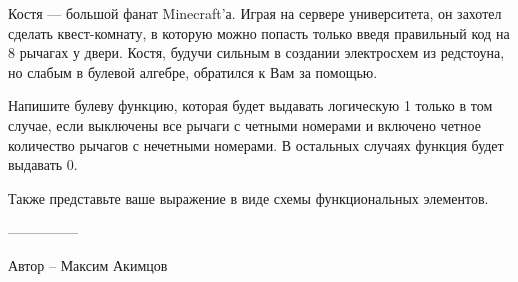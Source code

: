 \question
Костя — большой фанат Minecraft’а. Играя на сервере университета, он захотел сделать квест-комнату, в которую можно попасть только введя правильный код на 8 рычагах у двери. Костя, будучи сильным в создании электросхем из редстоуна, но слабым в булевой алгебре, обратился к Вам за помощью. 

Напишите булеву функцию, которая будет выдавать логическую 1 только в том случае, если выключены все рычаги с четными номерами и включено четное количество рычагов с нечетными номерами. В остальных случаях функция будет выдавать 0. 

Также представьте ваше выражение в виде схемы функциональных элементов.

---------------

Автор -- Максим Акимцов